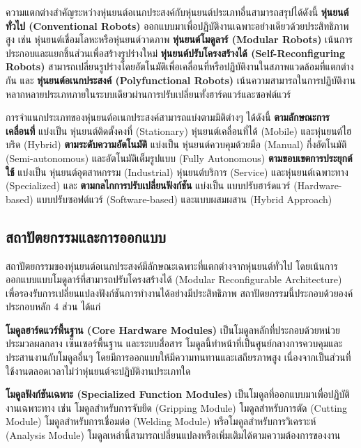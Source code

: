 \documentclass[a4paper]{article}
\begin{document}
ความแตกต่างสำคัญระหว่างหุ่นยนต์อเนกประสงค์กับหุ่นยนต์ประเภทอื่นสามารถสรุปได้ดังนี้ \textbf{หุ่นยนต์ทั่วไป (Conventional Robots)} ออกแบบมาเพื่อปฏิบัติงานเฉพาะอย่างเดียวด้วยประสิทธิภาพสูง เช่น หุ่นยนต์เชื่อมโลหะหรือหุ่นยนต์วาดภาพ \textbf{หุ่นยนต์โมดูลาร์ (Modular Robots)} เน้นการประกอบและแยกชิ้นส่วนเพื่อสร้างรูปร่างใหม่ \parencite{bi2016survey} \textbf{หุ่นยนต์ปรับโครงสร้างได้ (Self-Reconfiguring Robots)} สามารถเปลี่ยนรูปร่างโดยอัตโนมัติเพื่อเคลื่อนที่หรือปฏิบัติงานในสภาพแวดล้อมที่แตกต่างกัน \parencite{hameed2017modular} และ \textbf{หุ่นยนต์อเนกประสงค์ (Polyfunctional Robots)} เน้นความสามารถในการปฏิบัติงานหลากหลายประเภทภายในระบบเดียวผ่านการปรับเปลี่ยนทั้งฮาร์ดแวร์และซอฟต์แวร์

การจำแนกประเภทของหุ่นยนต์อเนกประสงค์สามารถแบ่งตามมิติต่างๆ ได้ดังนี้ \textbf{ตามลักษณะการเคลื่อนที่} แบ่งเป็น หุ่นยนต์ติดตั้งคงที่ (Stationary) หุ่นยนต์เคลื่อนที่ได้ (Mobile) และหุ่นยนต์ไฮบริด (Hybrid) \textbf{ตามระดับความอัตโนมัติ} แบ่งเป็น หุ่นยนต์ควบคุมด้วยมือ (Manual) กึ่งอัตโนมัติ (Semi-autonomous) และอัตโนมัติเต็มรูปแบบ (Fully Autonomous) \textbf{ตามขอบเขตการประยุกต์ใช้} แบ่งเป็น หุ่นยนต์อุตสาหกรรม (Industrial) หุ่นยนต์บริการ (Service) และหุ่นยนต์เฉพาะทาง (Specialized) และ \textbf{ตามกลไกการปรับเปลี่ยนฟังก์ชัน} แบ่งเป็น แบบปรับฮาร์ดแวร์ (Hardware-based) แบบปรับซอฟต์แวร์ (Software-based) และแบบผสมผสาน (Hybrid Approach)

\subsection{สถาปัตยกรรมและการออกแบบ}

สถาปัตยกรรมของหุ่นยนต์อเนกประสงค์มีลักษณะเฉพาะที่แตกต่างจากหุ่นยนต์ทั่วไป โดยเน้นการออกแบบแบบโมดูลาร์ที่สามารถปรับโครงสร้างได้ (Modular Reconfigurable Architecture) เพื่อรองรับการเปลี่ยนแปลงฟังก์ชันการทำงานได้อย่างมีประสิทธิภาพ \parencite{liang2025decoding} สถาปัตยกรรมนี้ประกอบด้วยองค์ประกอบหลัก 4 ส่วน ได้แก่

\textbf{โมดูลฮาร์ดแวร์พื้นฐาน (Core Hardware Modules)} เป็นโมดูลหลักที่ประกอบด้วยหน่วยประมวลผลกลาง เซ็นเซอร์พื้นฐาน และระบบสื่อสาร โมดูลนี้ทำหน้าที่เป็นศูนย์กลางการควบคุมและประสานงานกับโมดูลอื่นๆ โดยมีการออกแบบให้มีความทนทานและเสถียรภาพสูง เนื่องจากเป็นส่วนที่ใช้งานตลอดเวลาไม่ว่าหุ่นยนต์จะปฏิบัติงานประเภทใด

\textbf{โมดูลฟังก์ชันเฉพาะ (Specialized Function Modules)} เป็นโมดูลที่ออกแบบมาเพื่อปฏิบัติงานเฉพาะทาง เช่น โมดูลสำหรับการจับยึด (Gripping Module) โมดูลสำหรับการตัด (Cutting Module) โมดูลสำหรับการเชื่อมต่อ (Welding Module) หรือโมดูลสำหรับการวิเคราะห์ (Analysis Module) โมดูลเหล่านี้สามารถเปลี่ยนแปลงหรือเพิ่มเติมได้ตามความต้องการของงาน \parencite{post2023modular}
\end{document}
